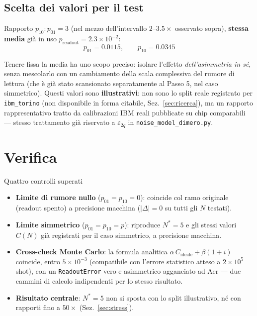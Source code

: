 \documentclass[11pt,a4paper]{article}
\begin{document}
\subsection{Scelta dei valori per il test}

\begin{keyeq}[title={Scelta dichiarata}]
\centering
Rapporto $p_{10}:p_{01}=3$ (nel mezzo dell'intervallo $2$--$3.5\times$
osservato sopra), \textbf{stessa media} già in uso $p_\text{readout}=2.3\times10^{-2}$:
$$p_{01}=0.0115, \qquad p_{10}=0.0345$$
\end{keyeq}
Tenere fissa la media ha uno scopo preciso: isolare l'effetto
\emph{dell'asimmetria in sé}, senza mescolarlo con un cambiamento della
scala complessiva del rumore di lettura (che è già stato scansionato
separatamente al Passo 5, nel caso simmetrico). Questi valori sono
\textbf{illustrativi}: non sono lo split reale registrato per
\texttt{ibm\_torino} (non disponibile in forma citabile, Sez.~\ref{sec:ricerca}),
ma un rapporto rappresentativo tratto da calibrazioni IBM reali pubblicate
su chip comparabili --- stesso trattamento già riservato a
$\varepsilon_{2q}$ in \texttt{noise\_model\_dimero.py}.

\section{Verifica}

\begin{okbox}{Quattro controlli superati}
\begin{itemize}[leftmargin=1.2em,itemsep=0.2em]
\item \textbf{Limite di rumore nullo} ($p_{01}=p_{10}=0$): coincide col
ramo originale (readout spento) a precisione macchina ($|\Delta|=0$ su
tutti gli $N$ testati).
\item \textbf{Limite simmetrico} ($p_{01}=p_{10}=p$): riproduce
$N^*=5$ e gli stessi valori $C(N)$ già registrati per il caso simmetrico,
a precisione macchina.
\item \textbf{Cross-check Monte Carlo}: la formula analitica
$\alpha\,C_\text{ideale}+\beta(1+i)$ coincide, entro $5\times10^{-3}$
(compatibile con l'errore statistico atteso a $2\times10^5$ shot), con un
\texttt{ReadoutError} vero e asimmetrico agganciato ad Aer --- due cammini
di calcolo indipendenti per lo stesso risultato.
\item \textbf{Risultato centrale}: $N^*=5$ non si sposta con lo split
illustrativo, né con rapporti fino a $50\times$ (Sez.~\ref{sec:stress}).
\end{itemize}
\end{okbox}
\end{document}
